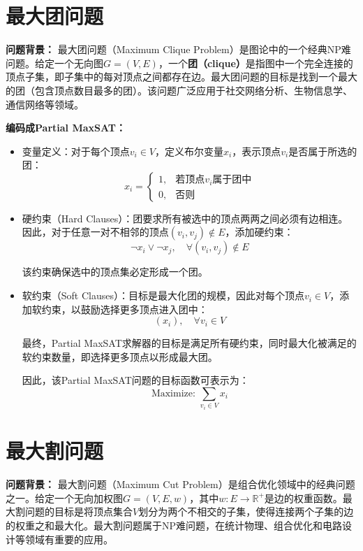 \documentclass{article}
\begin{document}
\newpage
\section*{最大团问题}
\textbf{问题背景：}
最大团问题（Maximum Clique Problem）是图论中的一个经典NP难问题。给定一个无向图$G=(V,E)$，一个\textbf{团（clique）}是指图中一个完全连接的顶点子集，即子集中的每对顶点之间都存在边。最大团问题的目标是找到一个最大的团（包含顶点数目最多的团）。该问题广泛应用于社交网络分析、生物信息学、通信网络等领域。


\textbf{编码成Partial MaxSAT：}
\begin{itemize}
    \item 变量定义：对于每个顶点$v_i \in V$，定义布尔变量$x_i$，表示顶点$v_i$是否属于所选的团：
    \[
    x_i = 
    \begin{cases}
    1, & \text{若顶点$v_i$属于团中} \\[4pt]
    0, & \text{否则}
    \end{cases}
    \]

    \item 硬约束（Hard Clauses）：团要求所有被选中的顶点两两之间必须有边相连。因此，对于任意一对不相邻的顶点$(v_i,v_j)\notin E$，添加硬约束：
    \[
    \neg x_i \vee \neg x_j,\quad \forall (v_i,v_j)\notin E
    \]

    该约束确保选中的顶点集必定形成一个团。

    \item 软约束（Soft Clauses）：目标是最大化团的规模，因此对每个顶点$v_i\in V$，添加软约束，以鼓励选择更多顶点进入团中：
    \[
    (x_i), \quad \forall v_i \in V
    \]

    最终，Partial MaxSAT求解器的目标是满足所有硬约束，同时最大化被满足的软约束数量，即选择更多顶点以形成最大团。
    
    因此，该Partial MaxSAT问题的目标函数可表示为：
    \[
    \text{Maximize: } \sum_{v_i\in V} x_i
    \]

\end{itemize}

\newpage
\section*{最大割问题}
\textbf{问题背景：}
最大割问题（Maximum Cut Problem）是组合优化领域中的经典问题之一。给定一个无向加权图$G=(V,E,w)$，其中$w:E\rightarrow\mathbb{R}^+$是边的权重函数。最大割问题的目标是将顶点集合$V$划分为两个不相交的子集，使得连接两个子集的边的权重之和最大化。最大割问题属于NP难问题，在统计物理、组合优化和电路设计等领域有重要的应用。
\end{document}

